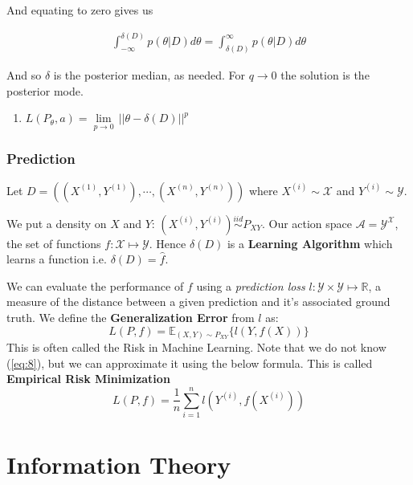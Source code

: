 \documentclass[]{article}
\theoremstyle{mattstyle}
\theoremstyle{definition}
\begin{document}
And equating to zero gives us

\begin{align*}
\int_{-\infty}^{\delta(D)}p(\theta|D)d\theta = \int_{\delta(D)}^{\infty}p(\theta|D)d\theta
\end{align*}

And so $\delta$ is the posterior median, as needed. For $q \rightarrow 0$ the solution is the posterior mode. 

\begin{enumerate}
	\item \(L(P_{\theta}, a) = \lim\limits_{p \rightarrow 0}\, || \theta - \delta(D) ||^p \)
\end{enumerate}


\subsubsection{Prediction}
Let $D=((X^{(1)},Y^{(1)}), \cdots, (X^{(n)},Y^{(n)}))$ where $X^{(i)} \sim \mathcal{X}$ and $Y^{(i)} \sim \mathcal{Y}$. 

We put a density on $X$ and $Y$: $(X^{(i)},Y^{(i)}) \overset{iid}{\sim} P_{XY}$. Our action space $\mathcal{A} = \mathcal{Y}^\mathcal{X}$, the set of functions $f: \mathcal{X}\mapsto \mathcal{Y}$. Hence \(\delta(D)\) is a \textbf{Learning Algorithm} which learns a function i.e. $\delta(D) = \hat{f}$. 

We can evaluate the performance of $f$ using a \emph{prediction loss} $l: \mathcal{Y} \times \mathcal{Y} \mapsto \mathbb{R}$, a measure of the distance between a given prediction and it’s associated ground truth. We define the \textbf{Generalization Error} from $l$ as:
\begin{equation}\label{eq:8}
L(P,f) = \mathbb{E}_{(X,Y)\sim P_{XY}}\{l(Y,f(X)) \}
\end{equation}
This is often called the Risk in Machine Learning. Note that we do not know (\ref{eq:8}), but we can approximate it using the below formula. This is called \textbf{Empirical Risk Minimization}
\begin{equation}
L(P,f) = \frac{1}{n}\sum_{i=1}^n l\left(Y^{(i)},f(X^{(i)})\right)
\end{equation}


\newpage



\section{Information Theory}
\end{document}
